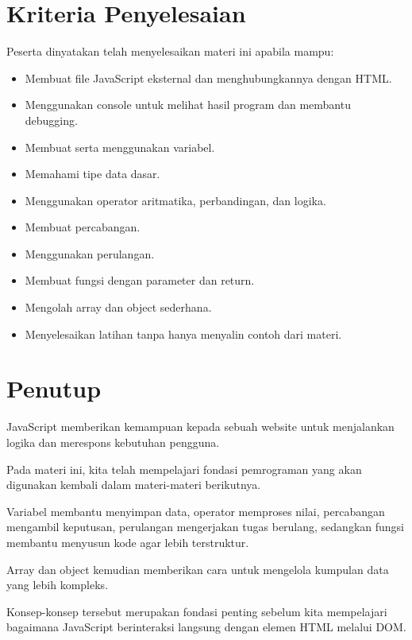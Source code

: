 \documentclass[12pt,a4paper]{article}
\begin{document}
\section{Kriteria Penyelesaian}

Peserta dinyatakan telah menyelesaikan materi ini
apabila mampu:

\begin{itemize}[label=$\square$]
    \item Membuat file JavaScript eksternal dan
    menghubungkannya dengan HTML.
    \item Menggunakan console untuk melihat hasil
    program dan membantu debugging.
    \item Membuat serta menggunakan variabel.
    \item Memahami tipe data dasar.
    \item Menggunakan operator aritmatika,
    perbandingan, dan logika.
    \item Membuat percabangan.
    \item Menggunakan perulangan.
    \item Membuat fungsi dengan parameter dan return.
    \item Mengolah array dan object sederhana.
    \item Menyelesaikan latihan tanpa hanya menyalin
    contoh dari materi.
\end{itemize}

\section{Penutup}

JavaScript memberikan kemampuan kepada sebuah
website untuk menjalankan logika dan merespons
kebutuhan pengguna.

Pada materi ini, kita telah mempelajari fondasi
pemrograman yang akan digunakan kembali dalam
materi-materi berikutnya.

Variabel membantu menyimpan data, operator
memproses nilai, percabangan mengambil keputusan,
perulangan mengerjakan tugas berulang, sedangkan
fungsi membantu menyusun kode agar lebih terstruktur.

Array dan object kemudian memberikan cara untuk
mengelola kumpulan data yang lebih kompleks.

Konsep-konsep tersebut merupakan fondasi penting
sebelum kita mempelajari bagaimana JavaScript
berinteraksi langsung dengan elemen HTML melalui
DOM.
\end{document}
